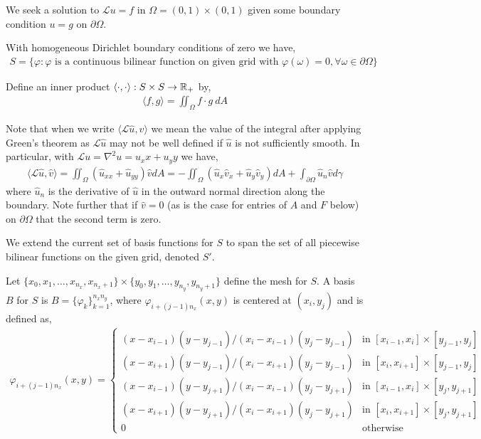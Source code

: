 \documentclass[10pt]{article}
\begin{document}
\begin{solution}[Solution]

We seek a solution to \( \mathcal{L} u = f \) in \( \Omega = (0,1)\times(0,1) \) given some boundary condition \( u = g \) on \( \partial \Omega \).

With homogeneous Dirichlet boundary conditions of zero we have,
\begin{align*}
    S = \{ \varphi : \varphi \text{ is a continuous bilinear function on given grid with } \varphi(\omega) = 0, \forall \omega\in\partial\Omega \}
\end{align*}

Define an inner product \( \langle \cdot, \cdot\rangle : S\times S\to\mathbb{R}_+ \) by,
\begin{align*}
    \langle f, g\rangle = \iint_\Omega f\cdot g~ dA
\end{align*}

Note that when we write \( \langle \mathcal{L} \hat{u},\hat{v} \rangle \) we mean the value of the integral after applying Green's theorem as \( \mathcal{L} \hat{u} \) may not be well defined if \( \hat{u} \) is not sufficiently smooth. In particular, with \( \mathcal{L} u = \nabla^2 u = u_xx + u_yy \) we have,
\begin{align*}
    \langle \mathcal{L} \hat{u},\hat{v} \rangle  = 
    \iint_\Omega (\hat{u}_{xx} + \hat{u}_{yy}) \hat{v} dA
    = - \iint_\Omega (\hat{u}_x\hat{v}_x+\hat{u}_y\hat{v}_y)dA + \int_{\partial\Omega} \hat{u}_{n}\hat{v} d\gamma
\end{align*}
where \( \hat{u}_n \) is the derivative of \( \hat{u} \) in the outward normal direction along the boundary. Note further that if \( \hat{v} = 0 \) (as is the case for entries of \( A \) and \( F \) below) on \( \partial \Omega \) that the second term is zero.




We extend the current set of basis functions for \( S \) to span the set of all piecewise bilinear functions on the given grid, denoted \( S' \).

Let \( \{x_0,x_1, \ldots, x_{n_x},x_{n_x+1}\} \times\{y_0,y_1, \ldots, y_{n_y},y_{n_y+1}\} \) define the mesh for \( S \).
A basis \( B \) for \( S \) is \( B =\{ \varphi_{k} \}_{k=1}^{n_xn_y} \), where \( \varphi_{i+(j-1)n_x}(x,y) \) is centered at \( (x_i,y_j) \) and is defined as,
\begin{align*}
    \varphi_{i + (j-1)n_x}(x,y) = 
    \begin{cases}
        (x-x_{i-1})(y-y_{j-1})/(x_i-x_{i-1})(y_j-y_{j-1}) & \text{in }[x_{i-1},x_i]\times [y_{j-1},y_j] \\
        (x-x_{i+1})(y-y_{j-1})/(x_i-x_{i+1})(y_j-y_{j-1}) & \text{in }[x_{i},x_{i+1}]\times [y_{j-1},y_j] \\
        (x-x_{i-1})(y-y_{j+1})/(x_i-x_{i-1})(y_j-y_{j+1}) & \text{in }[x_{i-1},x_i]\times [y_{j},y_{j+1}] \\
        (x-x_{i+1})(y-y_{j+1})/(x_i-x_{i+1})(y_j-y_{j+1}) & \text{in }[x_{i},x_{i+1}]\times [y_{j},y_{j+1}] \\
        0 & \text{otherwise}
    \end{cases}
\end{align*}


\end{solution}
\end{document}
